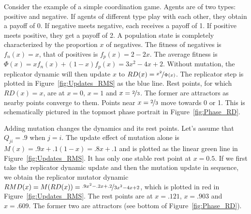 \documentclass[a4paper, 11pt]{article}
\begin{document}
Consider the example of a simple coordination game. Agents are of two types: positive and
negative. If agents of different type play with each other, they obtain a payoff of 0. If
negative meets negative, each receives a payoff of 1. If positive meets positive, they get a
payoff of 2. A population state is completely characterized by the proportion $x$ of
negatives. The fitness of negatives is $f_n(x) = x$, that of positives is $f_p(x) = 2-2x$. The
average fitness is $\Phi(x) = x f_n(x) + (1-x) f_p(x) = 3x^2 - 4x + 2$. Without mutation, the
replicator dynamic will then update $x$ to $RD(x) = \nicefrac{x^2}{\Phi(x)}$. The replicator
step is plotted in Figure~\ref{fig:Updates_RMS} as the blue line. Rest points, for which
$RD(x)=x$, are at $x=0$, $x=1$ and $x= \nicefrac{2}{3}$. The former are attractors as nearby
points converge to them. Points near $x=\nicefrac{2}{3}$ move towards 0 or 1. This is
schematically pictured in the topmost phase portrait in Figure~\ref{fig:Phase_RD}.

Adding mutation changes the dynamics and its rest points. Let's assume that $Q_{ji} = .9$ when
$j=i$. The update effect of mutation alone is $M(x) = .9 x + .1 (1-x) = .8x + .1$ and is
plotted as the linear green line in Figure~\ref{fig:Updates_RMS}. It has only one stable rest
point at $x = 0.5$. If we first take the replicator dynamic update and then the mutation update
in sequence, we obtain the replicator mutator dynamic $RMD(x) = M(RD(x)) = \nicefrac{.9x^2 -
  .2x +.2}{3x^2 - 4x + 2}$, which is plotted in red in Figure~\ref{fig:Updates_RMS}. The rest
points are at $x=.121$, $x=.903$ and $x=.609$. The former two are attractors (see bottom of
Figure~\ref{fig:Phase_RD}). 
\end{document}
